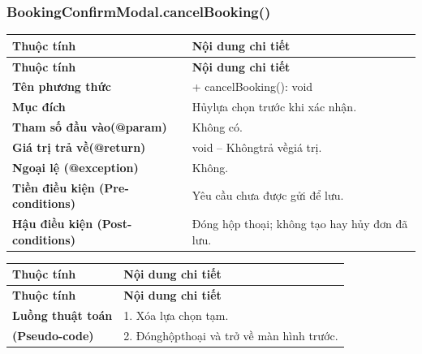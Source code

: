 \subsubsection{BookingConfirmModal.cancelBooking()}
\begin{longtable}{|L{0.24\textwidth}|L{0.70\textwidth}|}
\hline
\textbf{Thuộc tính} & \textbf{Nội dung chi tiết} \\
\hline
\endfirsthead
\hline
\textbf{Thuộc tính} & \textbf{Nội dung chi tiết} \\
\hline
\endhead
\textbf{Tên phương thức} & + cancelBooking(): void \\
\hline
\textbf{Mục đích} & Hủylựa chọn trước khi xác nhận. \\
\hline
\textbf{Tham số đầu vào}\newline \textbf{(@param)} & Không có. \\
\hline
\textbf{Giá trị trả về(@return)} & void – Khôngtrả vềgiá trị. \\
\hline
\textbf{Ngoại lệ (@exception)} & Không. \\
\hline
\textbf{Tiền điều kiện (Pre-}\newline \textbf{conditions)} & Yêu cầu chưa được gửi để lưu. \\
\hline
\textbf{Hậu điều kiện (Post-}\newline \textbf{conditions)} & Đóng hộp thoại; không tạo hay hủy đơn đã lưu. \\
\hline
\end{longtable}
\vspace{-0.5\baselineskip}
\begin{longtable}{|L{0.24\textwidth}|L{0.70\textwidth}|}
\hline
\textbf{Thuộc tính} & \textbf{Nội dung chi tiết} \\
\hline
\endfirsthead
\hline
\textbf{Thuộc tính} & \textbf{Nội dung chi tiết} \\
\hline
\endhead
\textbf{Luồng thuật toán} & 1. Xóa lựa chọn tạm. \\
\hline
\textbf{(Pseudo-code)} & 2. Đónghộpthoại và trở về màn hình trước. \\
\hline
\end{longtable}
\vspace{-0.5\baselineskip}
